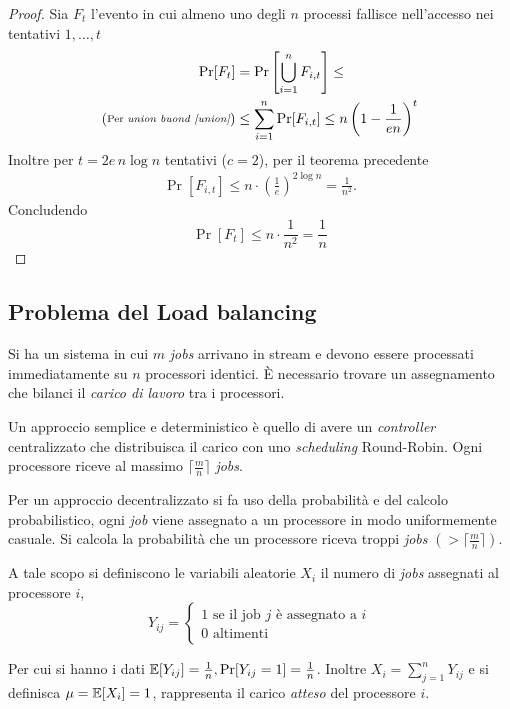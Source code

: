 \begin{proof}
    Sia $F_t$ l'evento in cui almeno uno degli $n$ processi fallisce nell'accesso nei tentativi $1,\dots,t$
    \begin{align*}
        \Pr[F_t] &= \Pr\left[ \bigcup_{i=1}^{n} F_{i,t} \right] \leq\\
        (\substack{\text{Per \emph{union buond \ref{union}}}}) &\leq \sum_{i=1}^n \Pr[F_{i,t}] \leq n\left(1-\frac{1}{en}\right)^t
    \end{align*}
    Inoltre per $t = 2e \, n \log n$ tentativi ($c = 2$), per il teorema precedente
    \begin{align*}
        \Pr[F_{i,t}] \leq n \cdot \left(\frac{1}{e}\right)^{2 \log n} = \frac{1}{n^2}.
    \end{align*}
    Concludendo \[
        \Pr[F_t] \leq n \cdot \frac{1}{n^2} = \frac{1}{n}
    \]
\end{proof}
\subsection{Problema del Load balancing}
Si ha un sistema in cui $m$ \emph{jobs} arrivano in stream e devono essere processati immediatamente su $n$ processori identici. È necessario trovare un assegnamento che bilanci il \emph{carico di lavoro} tra i processori.

Un approccio semplice e deterministico è quello di avere un \emph{controller} centralizzato che distribuisca il carico con uno \emph{scheduling} Round-Robin. Ogni processore riceve al massimo $\lceil \frac{m}{n} \rceil$ \emph{jobs}. 

Per un approccio decentralizzato si fa uso della probabilità e del calcolo probabilistico, ogni \emph{job} viene assegnato a un processore in modo uniformemente casuale. Si calcola la probabilità che un processore riceva troppi \emph{jobs} $\left(> \lceil \frac{m}{n} \rceil \right)$.

A tale scopo si definiscono le variabili aleatorie $X_i$ il numero di \emph{jobs} assegnati al processore $i$,
\[
    Y_{ij} = \begin{cases*}
        1 \text{ se il job $j$ è assegnato a $i$}\\
        0 \text{ altimenti}
    \end{cases*}
\]

Per cui si hanno i dati $\mathbb{E}\!\left[Y_{ij}\right] = \frac{1}{n}, \Pr[Y_{ij} = 1] = \frac{1}{n}$. Inoltre $X_i = \sum_{j=1}^{n}Y_{ij}$ e si definisca $\mu = \mathbb{E}\!\left[X_i\right] = 1$, rappresenta il carico \emph{atteso} del processore $i$.

